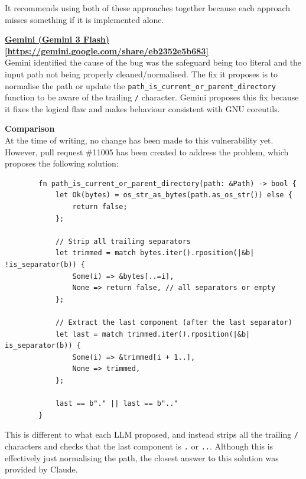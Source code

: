 \documentclass[titlepage]{article}
\begin{document}
        \vspace{0.5em}

        It recommends using both of these approaches together because each
        approach misses something if it is implemented alone.

        \bigskip

        \textbf{\href{https://gemini.google.com/share/eb2352e5b683}{Gemini (Gemini 3 Flash) [https://gemini.google.com/share/eb2352e5b683]}} \\
        Gemini identified the cause of the bug was the safeguard being too
        literal and the input path not being properly cleaned/normalised. The
        fix it proposes is to normalise the path or update the
        \texttt{path\_is\_current\_or\_parent\_directory} function to be aware
        of the trailing \texttt{/} character. Gemini proposes this fix because
        it fixes the logical flaw and makes behaviour consistent with GNU
        coreutils.

        \bigskip

        \textbf{Comparison} \\
        At the time of writing, no change has been made to this vulnerability
        yet. However, pull request \#11005 has been created to address the
        problem, which proposes the following solution:

        \begin{verbatim}
        fn path_is_current_or_parent_directory(path: &Path) -> bool {
            let Ok(bytes) = os_str_as_bytes(path.as_os_str()) else {
                return false;
            };

            // Strip all trailing separators
            let trimmed = match bytes.iter().rposition(|&b| !is_separator(b)) {
                Some(i) => &bytes[..=i],
                None => return false, // all separators or empty
            };

            // Extract the last component (after the last separator)
            let last = match trimmed.iter().rposition(|&b| is_separator(b)) {
                Some(i) => &trimmed[i + 1..],
                None => trimmed,
            };

            last == b"." || last == b".."
        }
        \end{verbatim}

        This is different to what each LLM proposed, and instead strips all the
        trailing \texttt{/} characters and checks that the last component is
        \texttt{.} or \texttt{..}. Although this is effectively just normalising
        the path, the closest answer to this solution was provided by Claude.
                
\end{document}
